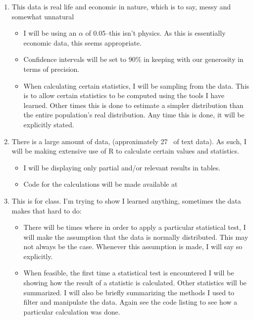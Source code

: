 \documentclass[letterpaper]{article}
\theoremstyle{definition}
\begin{document}
\begin{enumerate} \item This data is real life and economic in nature, which is to say, messy
	and somewhat unnatural

  \begin{itemize}
  \item
    I will be using an $\alpha$ of 0.05–this isn't physics. As this is essentially
	economic data, this seems appropriate.
  \item
	  Confidence intervals will be set to 90\% in keeping with our generosity in terms of
	  precision.
\item
	When calculating certain statistics, I will be sampling from the data. This is to
	allow certain statistics to be computed using the tools I have learned. Other times
	this is done to estimate a simpler distribution than the entire population's real
	distribution. Any time this is done, it will be explicitly stated.
  \end{itemize}
\item
	There is a large amount of data, (approximately 27\unit{\mega\byte} of text data). As
	such, I will be making extensive use of R to calculate certain values and statistics.

  \begin{itemize}
	\item
		I will be displaying only partial and/or relevant results in tables.
	\item
		Code for the calculations will be made available at 

  \end{itemize}
\item
  This is for class. I'm trying to show I learned anything, sometimes
  the data makes that hard to do:

  \begin{itemize}
  \item
	  There will be times where in order to apply a particular statistical test, I will
	  make the assumption that the data is normally distributed. This may not always be
	  the case. Whenever this assumption is made, I will say so explicitly.
	\item
		When feasible, the first time a statistical test is encountered I will be showing
		how the result of a statistic is calculated. Other statistics will be summarized.
		I will also be briefly summarizing the methods I used to filter and manipulate the
		data. Again see the code listing to see how a particular calculation was done.
  \end{itemize}
\end{enumerate}
\end{document}
